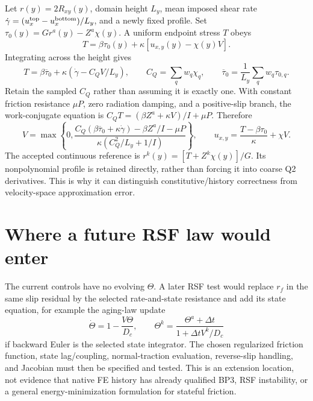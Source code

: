 \documentclass[11pt,a4paper]{article}
\begin{document}
Let $r(y)=2R_{xy}(y)$, domain height $L_y$, mean imposed shear rate
$\dot\gamma=(u_x^{\rm top}-u_x^{\rm bottom})/L_y$, and a newly fixed profile.
Set $\tau_0(y)=G r^a(y)-Z^a\chi(y)$. A uniform endpoint stress $T$ obeys
\begin{equation}
 T=\beta\tau_0(y)+\kappa[u_{x,y}(y)-\chi(y)V].
\end{equation}
Integrating across the height gives
\begin{equation}
 T=\beta\overline\tau_0+\kappa(\dot\gamma-C_QV/L_y),
 \qquad C_Q=\sum_q w_q\chi_q,
 \qquad \overline\tau_0=\frac1{L_y}\sum_q w_q\tau_{0,q}.
\end{equation}
Retain the sampled $C_Q$ rather than assuming it is exactly one. With constant
friction resistance $\mu P$, zero radiation damping, and a positive-slip branch,
the work-conjugate equation is
$C_QT=(\beta Z^a+\kappa V)/I+\mu P$. Therefore
\begin{equation}
 V=\max\left\{0,
 \frac{C_Q(\beta\overline\tau_0+\kappa\dot\gamma)
                -\beta Z^a/I-\mu P}
      {\kappa(C_Q^2/L_y+1/I)}\right\},\qquad
 u_{x,y}=\frac{T-\beta\tau_0}{\kappa}+\chi V.
\end{equation}
The accepted continuous reference is $r^k(y)=[T+Z^k\chi(y)]/G$.
Its nonpolynomial profile is retained directly, rather than forcing it into
coarse Q2 derivatives. This is why it can distinguish constitutive/history
correctness from velocity-space approximation error.

\section{Where a future RSF law would enter}

The current controls have no evolving $\Theta$. A later RSF test would replace
$r_f$ in the same slip residual by the selected rate-and-state resistance and
add its state equation, for example the aging-law update
\begin{equation}
 \dot\Theta=1-\frac{V\Theta}{D_c},\qquad
 \Theta^k=\frac{\Theta^a+\Delta t}{1+\Delta t V^k/D_c}
\end{equation}
if backward Euler is the selected state integrator. The chosen regularized
friction function, state lag/coupling, normal-traction evaluation, reverse-slip
handling, and Jacobian must then be specified and tested. This is an extension
location, not evidence that native FE history has already qualified BP3, RSF
instability, or a general energy-minimization formulation for stateful friction.
\end{document}
